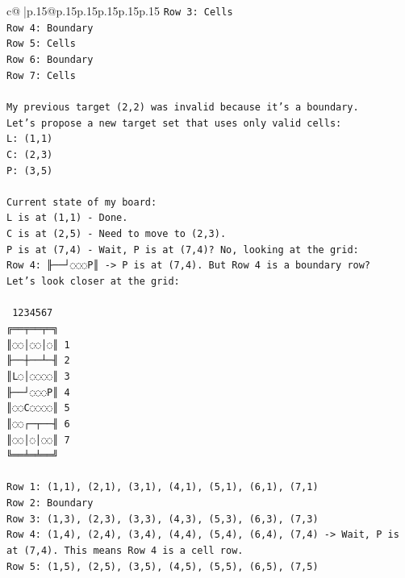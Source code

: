 \documentclass{article}
\begin{document}
{\begin{supertabular}{c@{$\;$}|p{.15\linewidth}@{}p{.15\linewidth}p{.15\linewidth}p{.15\linewidth}p{.15\linewidth}p{.15\linewidth}}
{{{\texttt{Row 3: Cells} \\
\texttt{Row 4: Boundary} \\
\texttt{Row 5: Cells} \\
\texttt{Row 6: Boundary} \\
\texttt{Row 7: Cells} \\
\\ 
\texttt{My previous target (2,2) was invalid because it's a boundary.} \\
\texttt{Let's propose a new target set that uses only valid cells:} \\
\texttt{L: (1,1)} \\
\texttt{C: (2,3)} \\
\texttt{P: (3,5)} \\
\\ 
\texttt{Current state of my board:} \\
\texttt{L is at (1,1) {-} Done.} \\
\texttt{C is at (2,5) {-} Need to move to (2,3).} \\
\texttt{P is at (7,4) {-} Wait, P is at (7,4)? No, looking at the grid:} \\
\texttt{Row 4: ╟──┘◌◌◌P║ {-}> P is at (7,4). But Row 4 is a boundary row?} \\
\texttt{Let's look closer at the grid:} \\
\\ 
\texttt{ 1234567} \\
\texttt{╔══╤══╤═╗} \\
\texttt{║◌◌│◌◌│◌║ 1} \\
\texttt{╟──┼──┴─╢ 2} \\
\texttt{║L◌│◌◌◌◌║ 3} \\
\texttt{╟──┘◌◌◌P║ 4} \\
\texttt{║◌◌C◌◌◌◌║ 5} \\
\texttt{║◌◌┌─┬──╢ 6} \\
\texttt{║◌◌│◌│◌◌║ 7} \\
\texttt{╚══╧═╧══╝} \\
\\ 
\texttt{Row 1: (1,1), (2,1), (3,1), (4,1), (5,1), (6,1), (7,1)} \\
\texttt{Row 2: Boundary} \\
\texttt{Row 3: (1,3), (2,3), (3,3), (4,3), (5,3), (6,3), (7,3)} \\
\texttt{Row 4: (1,4), (2,4), (3,4), (4,4), (5,4), (6,4), (7,4) {-}> Wait, P is at (7,4). This means Row 4 is a cell row.} \\
\texttt{Row 5: (1,5), (2,5), (3,5), (4,5), (5,5), (6,5), (7,5)} \\
}}}
\end{supertabular}}
\end{document}
